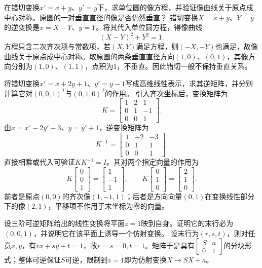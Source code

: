 在错切变换\(x'=x+y\)、\(y'=y\)下，求单位圆的像方程，并验证像曲线关于原点成中心对称。原圆的一对垂直直径的像是否仍然垂直？
\solutionanswer
错切变换\(X=x+y\)、\(Y=y\)的逆变换是\(x=X-Y\)、\(y=Y\)。将其代入单位圆方程，得像曲线
\[
(X-Y)^2+Y^2=1.
\]
方程只含二次齐次项与常数项，若\((X,Y)\)满足方程，则\((-X,-Y)\)也满足，故像曲线关于原点成中心对称。取原圆的两条垂直直径方向\((1,0)\)、\((0,1)\)，其像方向分别为\((1,0)\)、\((1,1)\)，点积为\(1\)，不垂直。因此错切一般不保持垂直关系。


将错切变换\(x'=x+2y+1\)、\(y'=y-1\)写成高维线性表示，求其逆矩阵，并分别计算它对\((0,0,1)^T\)与\((0,1,0)^T\)的作用。
\solutionanswer
引入齐次坐标后，变换矩阵为
\[
K=\begin{bmatrix}1&2&1\\0&1&-1\\0&0&1\end{bmatrix}.
\]
由\(x=x'-2y'-3\)、\(y=y'+1\)，逆变换矩阵为
\[
K^{-1}=\begin{bmatrix}1&-2&-3\\0&1&1\\0&0&1\end{bmatrix}.
\]
直接相乘或代入可验证\(KK^{-1}=I\)。其对两个指定向量的作用为
\[
K\begin{bmatrix}0\\0\\1\end{bmatrix}=\begin{bmatrix}1\\-1\\1\end{bmatrix},\qquad
K\begin{bmatrix}0\\1\\0\end{bmatrix}=\begin{bmatrix}2\\1\\0\end{bmatrix}.
\]
前者是原点\((0,0)\)的齐次像\((1,-1,1)\)；后者是方向向量\((0,1)\)在变换线性部分下的像\((2,1)\)，平移项不作用于末坐标为零的向量。


设三阶可逆矩阵给出的线性变换将平面\(z=1\)映到自身。证明它的末行必为\((0,0,1)\)，并说明它在该平面上诱导一个仿射变换。
\solutionanswer
设末行为\((r,s,t)\)，则对任意\(x,y\)，有\(rx+sy+t=1\)，故\(r=s=0,t=1\)。矩阵于是具有\(\begin{bmatrix}S&a\\0&1\end{bmatrix}\)的分块形式；整体可逆保证\(S\)可逆，限制到\(z=1\)即为仿射变换\(X\mapsto SX+a\)。


